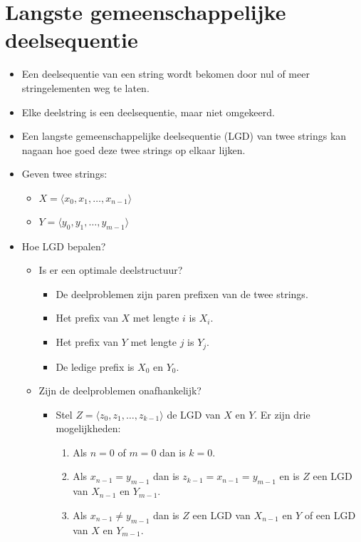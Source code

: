 \section{Langste gemeenschappelijke deelsequentie}
\begin{itemize}
    \item Een deelsequentie van een string wordt bekomen door nul of meer stringelementen weg te laten.
    \item Elke deelstring is een deelsequentie, maar niet omgekeerd.
    \item Een langste gemeenschappelijke deelsequentie (LGD) van twee strings kan nagaan hoe goed deze twee strings op elkaar lijken.
    \item Geven twee strings:
    \begin{itemize}
        \item $X = \langle x_0, x_1, \dots, x_{n - 1}\rangle$
        \item $Y = \langle y_0, y_1, \dots, y_{m - 1}\rangle$
    \end{itemize}
    \item Hoe LGD bepalen?
    \begin{itemize}
        \item Is er een optimale deelstructuur?
        \begin{itemize}
            \item De deelproblemen zijn paren prefixen van de twee strings. 
            \item Het prefix van $X$ met lengte $i$ is $X_i$.
            \item Het prefix van $Y$ met lengte $j$ is $Y_j$.
            \item De ledige prefix is $X_0$ en $Y_0$.
        \end{itemize}
        \item Zijn de deelproblemen onafhankelijk?
        \begin{itemize}
            \item Stel $Z = \langle z_0, z_1, \dots, z_{k - 1} \rangle$ de LGD van $X$ en $Y$. Er zijn drie mogelijkheden:
            \begin{enumerate}
                \item Als $n = 0$ of $m = 0$ dan is $k = 0$.
                \item Als $x_{n - 1} = y_{m - 1}$ dan is $z_{k - 1} = x_{n - 1} = y_{m - 1}$ en is $Z$ een LGD van $X_{n - 1}$ en $Y_{m - 1}$.
                \item Als $x_{n - 1} \neq y_{m - 1}$ dan is $Z$ een LGD van $X_{n - 1}$ en $Y$ of een LGD van $X$ en $Y_{m - 1}$.

\end{enumerate}
\end{itemize}
\end{itemize}
\end{itemize}
